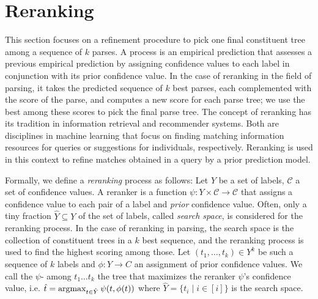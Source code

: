 \documentclass[../../document.tex]{subfiles}
\begin{document}
    \section{Reranking}\label{sec:reranking}
    This section focuses on a refinement procedure to pick one final constituent tree among a sequence of \(k\) parses.
    A  process is an empirical prediction that assesses a previous empirical prediction by assigning confidence values to each label in conjunction with its prior confidence value.
    In the case of reranking in the field of parsing, it takes the predicted sequence of \(k\) best parses, each complemented with the score of the parse, and computes a new score for each parse tree; we use the best among these scores to pick the final parse tree.
    The concept of reranking has its tradition in information retrieval and recommender systems. Both are disciplines in machine learning that focus on finding matching information resources for queries or suggestions for individuals, respectively.
    Reranking is used in this context to refine matches obtained in a query by a prior prediction model. \citep{carbonell1998use,adomavicius2009toward}
    
    Formally, we define a \emph{reranking} process as follows:
        Let \(Y\) be a set of labels, \(\mathcal{C}\) a set of confidence values.
        A reranker is a function \(\psi \colon Y \times \mathcal{C} \to \mathcal{C}\) that assigns a confidence value to each pair of a label and \emph{prior} confidence value.
    Often, only a tiny fraction \(\hat{Y} \subseteq Y\) of the set of labels, called \emph{search space}, is considered for the reranking process.
    In the case of reranking in parsing, the search space is the collection of constituent trees in a \(k\) best sequence, and the reranking process is used to find the highest scoring among those.
    Let \((t_1, \ldots, t_k) \in Y^k\) be such a sequence of \(k\) labels and \(\phi \colon Y \to C\) an assignment of prior confidence values.
    We call the \(\psi\)- among \(t_1 \ldots t_k\) the tree that maximizes the reranker \(\psi\)'s confidence value, i.e. \(
        \hat{t} = \operatorname{arg max}_{t \in \hat{Y}} \psi(t, \phi(t))
    \) where \(\hat{Y} = \{t_i \mid i \in [i]\}\) is the search space.
    
\end{document}
